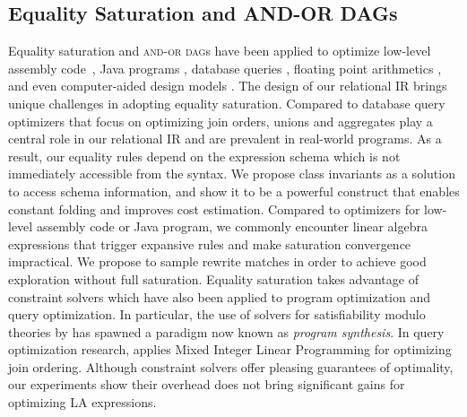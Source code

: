 \subsection{Equality Saturation and AND-OR DAGs}
Equality saturation and \textsc{and-or dag}s have been applied to optimize
low-level assembly code~\cite{DBLP:conf/pldi/JoshiNR02}, Java programs \cite{DBLP:journals/corr/abs-1012-1802}, 
database queries \cite{Graefe95a}, floating point arithmetics \cite{DBLP:conf/pldi/PanchekhaSWT15}, and even computer-aided
design models \cite{DBLP:journals/corr/abs-1909-12252}. The design of our relational IR brings unique challenges
in adopting equality saturation. Compared to database query optimizers 
that focus on optimizing join orders, unions and aggregates play a central
role in our relational IR and are prevalent in real-world programs. As
a result, our
equality rules depend on the expression schema which is not immediately accessible
from the syntax. We propose class invariants as a solution to access schema
information, and show it to be a powerful construct that enables constant
folding and improves cost estimation. Compared to optimizers for low-level
assembly code or Java program, we commonly encounter linear algebra expressions
that trigger expansive rules and make saturation convergence impractical. 
We propose to sample rewrite matches in order to achieve good exploration
without full saturation. Equality saturation takes advantage of constraint solvers which have also been applied to program optimization and query
optimization. In particular, the use of solvers for satisfiability
modulo theories by \cite{DBLP:conf/asplos/Solar-LezamaTBSS06} has spawned a paradigm now known as \textit{program synthesis}. 
In query optimization research, 
\cite{DBLP:conf/sigmod/Trummer017} applies Mixed Integer Linear Programming for optimizing join ordering. 
Although constraint solvers offer pleasing guarantees of optimality, our
experiments show their overhead does not bring significant gains for optimizing
LA expressions. 


